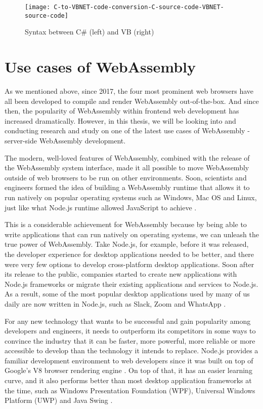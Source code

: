 \bigskip
\begin{figure}[hp]
\centering
\texttt{[image: C-to-VBNET-code-conversion-C-source-code-VBNET-source-code]}
\caption{\footnotesize{Syntax between C\# (left) and VB (right) \cite{int26}}}
\captionsetup{aboveskip=0pt,font=it}
\end{figure}
\bigskip

\newpage
\section{Use cases of WebAssembly}

As we mentioned above, since 2017, the four most prominent web browsers have all been developed to compile and render WebAssembly out-of-the-box. And since then, the popularity of WebAssembly within frontend web development has increased dramatically. However, in this thesis, we will be looking into and conducting research and study on one of the latest use cases of WebAssembly - server-side WebAssembly development.

The modern, well-loved features of WebAssembly, combined with the release of the WebAssembly system interface, made it all possible to move WebAssembly outside of web browsers to be run on other environments. Soon, scientists and engineers formed the idea of building a WebAssembly runtime that allows it to run natively on popular operating systems such as Windows, Mac OS and Linux, just like what Node.js runtime allowed JavaScript to achieve \cite{int27}.

This is a considerable achievement for WebAssembly because by being able to write applications that can run natively on operating systems, we can unleash the true power of WebAssembly. Take Node.js, for example, before it was released, the developer experience for desktop applications needed to be better, and there were very few options to develop cross-platform desktop applications. Soon after its release to the public, companies started to create new applications with Node.js frameworks or migrate their existing applications and services to Node.js. As a result, some of the most popular desktop applications used by many of us daily are now written in Node.js, such as Slack, Zoom and WhatsApp \cite{int28} \cite{int29} \cite{int30}.

For any new technology that wants to be successful and gain popularity among developers and engineers, it needs to outperform its competitors in some ways to convince the industry that it can be faster, more powerful, more reliable or more accessible to develop than the technology it intends to replace. Node.js provides a familiar development environment to web developers since it was built on top of Google's V8 browser rendering engine \cite{int31}. On top of that, it has an easier learning curve, and it also performs better than most desktop application frameworks at the time, such as Windows Presentation Foundation (WPF), Universal Windows Platform (UWP) and Java Swing \cite{int32} \cite{int33} \cite{int34}.

